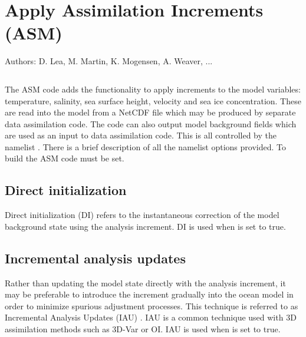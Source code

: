 \documentclass[../tex_main/NEMO_manual]{subfiles}
\begin{document}
\chapter{Apply Assimilation Increments (ASM)}
\label{chap:ASM}

Authors: D. Lea,  M. Martin, K. Mogensen, A. Weaver, ...   %

\minitoc


\newpage
$\ $\newline    %

The ASM code adds the functionality to apply increments to the model variables: temperature, salinity,
sea surface height, velocity and sea ice concentration. 
These are read into the model from a NetCDF file which may be produced by separate data assimilation code.
The code can also output model background fields which are used as an input to data assimilation code.
This is all controlled by the namelist \textit{ }.
There is a brief description of all the namelist options provided.
To build the ASM code  must be set.


\section{Direct initialization}
\label{sec:ASM_DI}

Direct initialization (DI) refers to the instantaneous correction of the model background state using
the analysis increment.
DI is used when  is set to true.

\section{Incremental analysis updates}
\label{sec:ASM_IAU}

Rather than updating the model state directly with the analysis increment,
it may be preferable to introduce the increment gradually into the ocean model in order to
minimize spurious adjustment processes.
This technique is referred to as Incremental Analysis Updates (IAU) \citep{Bloom_al_MWR96}.
IAU is a common technique used with 3D assimilation methods such as 3D-Var or OI.
IAU is used when  is set to true.
\end{document}
